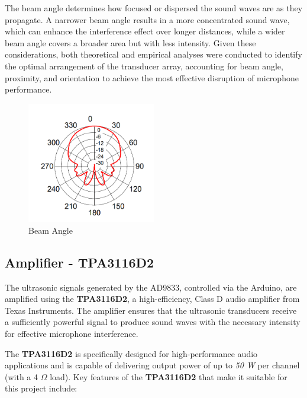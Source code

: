 The beam angle determines how focused or dispersed the sound waves are as they propagate. A narrower beam angle results in a more concentrated sound wave, which can enhance the interference effect over longer distances, while a wider beam angle covers a broader area but with less intensity. Given these considerations, both theoretical and empirical analyses were conducted to identify the optimal arrangement of the transducer array, accounting for beam angle, proximity, and orientation to achieve the most effective disruption of microphone performance.
\begin{figure}[h!]
    \centering
    \includegraphics[width=0.5\textwidth]{images/Beam_Angle.png}
    \caption{Beam Angle}
    \label{fig:transducer_shape}
\end{figure}

\subsection{Amplifier - TPA3116D2}

The ultrasonic signals generated by the AD9833, controlled via the Arduino, are amplified using the \textbf{TPA3116D2}, a high-efficiency, Class D audio amplifier from Texas Instruments. The amplifier ensures that the ultrasonic transducers receive a sufficiently powerful signal to produce sound waves with the necessary intensity for effective microphone interference.

The \textbf{TPA3116D2} is specifically designed for high-performance audio applications and is capable of delivering output power of up to \textit{50 W} per channel (with a 4 $\Omega$ load). Key features of the \textbf{TPA3116D2} that make it suitable for this project include:

